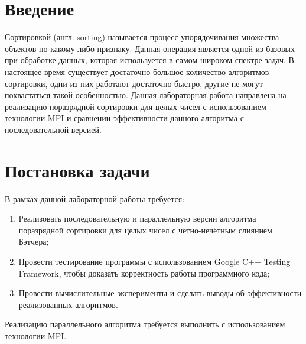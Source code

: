 \documentclass{report}
\begin{document}
\setcounter{page}{2}

\tableofcontents
\newpage

\section*{Введение}
\par Сортировкой (англ. sorting) называется процесс упорядочивания множества объектов по какому-либо признаку. Данная операция является одной из базовых при обработке данных, которая используется в самом широком спектре задач. В настоящее время существует достаточно большое количество алгоритмов сортировки, одни из них работают достаточно быстро, другие не могут похвастаться такой особенностью. Данная лабораторная работа направлена на реализацию поразрядной сортировки для целых чисел с использованием технологии MPI и сравнении эффективности данного алгоритма с последовательной версией.
\newpage

\section*{Постановка задачи}
\par В рамках данной лабораторной работы требуется:
\begin{enumerate}
\item Реализовать последовательную и параллельную версии алгоритма поразрядной сортировки для целых чисел с чётно-нечётным слиянием Бэтчера;
\item Провести тестирование программы с использованием Google C++ Testing Framework, чтобы доказать корректность работы программного кода;
\item Провести вычислительные эксперименты и сделать выводы об эффективности реализованных алгоритмов.
\end{enumerate}
Реализацию параллельного алгоритма требуется выполнить с использованием технологии MPI.
\newpage

\end{document}
